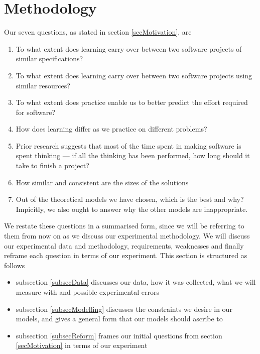 \section{Methodology} \label{secMethod}

Our seven questions, as stated in section \ref{secMotivation}, are
\begin{enumerate}
  \item To what extent does learning carry over between two software projects of similar
  specifications?\label{questOne}
  \item To what extent does learning carry over between two software projects using
  similar resources?\label{questTwo}
  \item To what extent does practice enable us to better predict the effort required
  for software?\label{questThree}
  \item How does learning differ as we practice on different problems? \label{questFour}
  \item Prior research suggests that most of the time spent in making software is spent
thinking --- if all the thinking has been performed, how long should it take to
finish a project?\label{questFive}
  \item  How similar and consistent are the sizes of the solutions\label{questSix}
  \item Out of the theoretical models we have chosen, which is the best and why?
  Impicitly, we also ought to answer why the other models are inappropriate.\label{questSeven}
\end{enumerate}

We restate these questions in a summarised form, since we will be referring to
them from now on as we discuss our experimental methodology.
We will discuss our experimental data and methodology, requirements, weaknesses
and finally reframe each question in terms of our experiment.
This section is structured as follows
\begin{itemize}
  \item subsection \ref{subsecData} discusses our data, how it was collected,
  what we will measure with and possible experimental errors
  \item subsection \ref{subsecModelling} discusses the constraints we desire in
  our models, and gives a general form that our models should ascribe to
  \item subsection \ref{subsecReform} frames our initial questions from section
  \ref{secMotivation} in terms of our experiment
\end{itemize}

